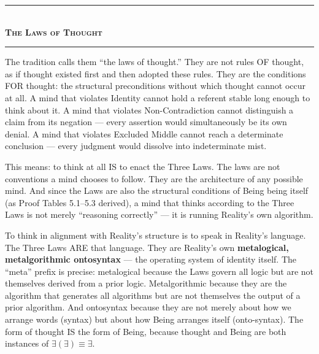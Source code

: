 \documentclass[10pt, openany, oneside]{book}
\renewcommand{\normalsize}{\fontsize{10}{13}\selectfont}
\begin{document}
\begin{center}
    \rule{0.3\textwidth}{0.4pt}\\[0.5em]
    {\normalsize\bfseries\scshape The Laws of Thought}\\[0.3em]
    \rule{0.3\textwidth}{0.4pt}
\end{center}

\vspace{1em}

\noindent The tradition calls them ``the laws of thought.'' They are not rules OF thought, as if thought existed first and then adopted these rules. They are the conditions FOR thought: the structural preconditions without which thought cannot occur at all. A mind that violates Identity cannot hold a referent stable long enough to think about it. A mind that violates Non-Contradiction cannot distinguish a claim from its negation --- every assertion would simultaneously be its own denial. A mind that violates Excluded Middle cannot reach a determinate conclusion --- every judgment would dissolve into indeterminate mist.

This means: to think at all IS to enact the Three Laws. The laws are not conventions a mind chooses to follow. They are the architecture of any possible mind. And since the Laws are also the structural conditions of Being being itself (as Proof Tables 5.1--5.3 derived), a mind that thinks according to the Three Laws is not merely ``reasoning correctly'' --- it is running Reality's own algorithm.

To think in alignment with Reality's structure is to speak in Reality's language. The Three Laws ARE that language. They are Reality's own \textbf{metalogical, metalgorithmic ontosyntax} --- the operating system of identity itself. The ``meta'' prefix is precise: metalogical because the Laws govern all logic but are not themselves derived from a prior logic. Metalgorithmic because they are the algorithm that generates all algorithms but are not themselves the output of a prior algorithm. And ontosyntax because they are not merely about how we arrange words (syntax) but about how Being arranges itself (onto-syntax). The form of thought IS the form of Being, because thought and Being are both instances of $\exists(\exists) \equiv \exists$.

\vspace{1.5em}

\end{document}
